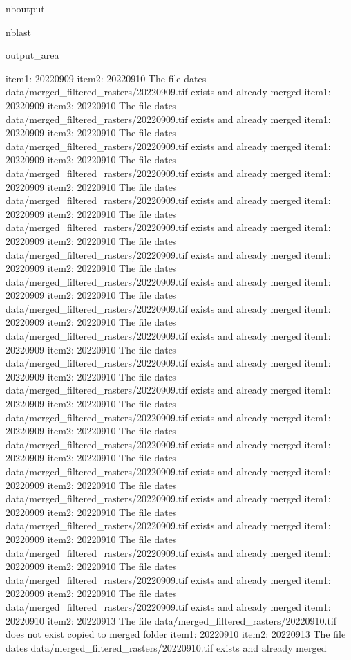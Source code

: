 \documentclass[letterpaper,10pt]{sphinxmanual}
\begin{document}
\begin{sphinxuseclass}{nboutput}
\begin{sphinxuseclass}{nblast}
{\begin{sphinxuseclass}{output_area}
\begin{sphinxuseclass}{}
\begin{sphinxVerbatim}[commandchars=\\\{\}]
item1:  20220909
item2:  20220910
The file dates data/merged\_filtered\_rasters/20220909.tif exists and already merged
item1:  20220909
item2:  20220910
The file dates data/merged\_filtered\_rasters/20220909.tif exists and already merged
item1:  20220909
item2:  20220910
The file dates data/merged\_filtered\_rasters/20220909.tif exists and already merged
item1:  20220909
item2:  20220910
The file dates data/merged\_filtered\_rasters/20220909.tif exists and already merged
item1:  20220909
item2:  20220910
The file dates data/merged\_filtered\_rasters/20220909.tif exists and already merged
item1:  20220909
item2:  20220910
The file dates data/merged\_filtered\_rasters/20220909.tif exists and already merged
item1:  20220909
item2:  20220910
The file dates data/merged\_filtered\_rasters/20220909.tif exists and already merged
item1:  20220909
item2:  20220910
The file dates data/merged\_filtered\_rasters/20220909.tif exists and already merged
item1:  20220909
item2:  20220910
The file dates data/merged\_filtered\_rasters/20220909.tif exists and already merged
item1:  20220909
item2:  20220910
The file dates data/merged\_filtered\_rasters/20220909.tif exists and already merged
item1:  20220909
item2:  20220910
The file dates data/merged\_filtered\_rasters/20220909.tif exists and already merged
item1:  20220909
item2:  20220910
The file dates data/merged\_filtered\_rasters/20220909.tif exists and already merged
item1:  20220909
item2:  20220910
The file dates data/merged\_filtered\_rasters/20220909.tif exists and already merged
item1:  20220909
item2:  20220910
The file dates data/merged\_filtered\_rasters/20220909.tif exists and already merged
item1:  20220909
item2:  20220910
The file dates data/merged\_filtered\_rasters/20220909.tif exists and already merged
item1:  20220909
item2:  20220910
The file dates data/merged\_filtered\_rasters/20220909.tif exists and already merged
item1:  20220909
item2:  20220910
The file dates data/merged\_filtered\_rasters/20220909.tif exists and already merged
item1:  20220909
item2:  20220910
The file dates data/merged\_filtered\_rasters/20220909.tif exists and already merged
item1:  20220909
item2:  20220910
The file dates data/merged\_filtered\_rasters/20220909.tif exists and already merged
item1:  20220909
item2:  20220910
The file dates data/merged\_filtered\_rasters/20220909.tif exists and already merged
item1:  20220910
item2:  20220913
The file data/merged\_filtered\_rasters/20220910.tif does not exist copied to merged folder
item1:  20220910
item2:  20220913
The file dates data/merged\_filtered\_rasters/20220910.tif exists and already merged

\end{sphinxVerbatim}
\end{sphinxuseclass}
\end{sphinxuseclass}}
\end{sphinxuseclass}
\end{sphinxuseclass}
\end{document}
